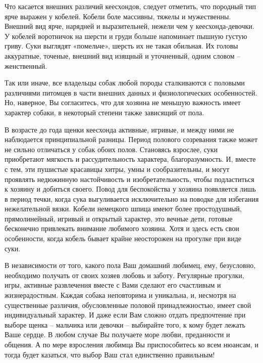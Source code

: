 \documentclass{article}
\begin{document}
  Что касается внешних различий кеесхондов, следует отметить,
  что породный тип ярче выражен у кобелей. Кобели боле массивны,
  тяжелы и мужественны. Внешний вид ярче, нарядней и выразительней,
  нежели чем у кеесхонда-девочки. У кобелей воротничок на шерсти
  и груди больше напоминает пышную густую гриву. Суки выглядят
  «помельче», шерсть их не такая обильная. Их головы аккуратные,
  точеные, внешний вид изящный и уточненный, одним словом –
  женственный.

  Так или иначе, все владельцы собак любой породы сталкиваются
  с половыми различиями питомцев в части внешних данных и
  физиологических особенностей. Но, наверное, Вы согласитесь,
  что для хозяина не меньшую важность имеет характер собаки, в
  некоторый степени также зависящий от пола.

  В возрасте до года щенки кеесхонда активные, игривые, и
  между ними не наблюдается принципиальной разницы. Период
  полового созревания также может не сильно отличаться у собак
  обоих полов. Становясь взрослее, суки приобретают мягкость и
  рассудительность характера, благоразумность. И, вместе с тем,
  эти пушистые красавицы хитры, умны и сообразительны, и могут
  проявлять недюжинную настойчивость и изобретательность,
  чтобы подластиться к хозяину и добиться своего. Повод для
  беспокойства у хозяина появляется лишь в период течки, когда
  сука выгуливается исключительно на поводке для избегания
  нежелательной вязки. Кобели немецкого шпица имеют более
  простодушный, прямолинейный, игривый и открытый характер, это
  вечные дети, готовые бесконечно привлекать внимание любимого
  хозяина. Хотя и здесь есть свои особенности, когда кобель бывает
  крайне неосторожен на прогулке при виде суки.

  В независимости от того, какого пола Ваш домашний любимец,
  ему, безусловно, необходимо получать от своих хозяев любовь
  и заботу. Регулярные прогулки, игры, активные развлечения
  вместе с Вами сделают его счастливым и жизнерадостным. Каждая
  собака неповторима и уникальна, и, несмотря на существенные
  различия, обусловленные половой принадлежностью, имеет
  свой индивидуальный характер. И даже если Вам сложно отдать
  предпочтение при выборе щенка – мальчика или девочки
  – выбирайте того, к кому будет лежать Ваше сердце. В любом
  случае Вы получаете море любви, преданности и общения. А по мере
  взросления любимца Вы приспособитесь ко всем нюансам, и тогда
  будет казаться, что выбор Ваш стал единственно правильным!
\end{document}
